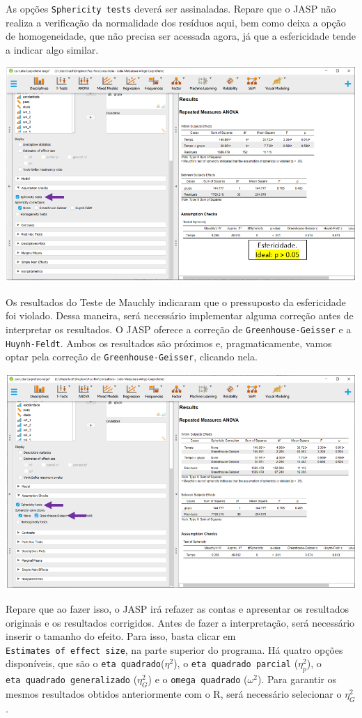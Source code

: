 \documentclass[
]{book}
\begin{document}
As opções \texttt{Sphericity\ tests} deverá ser assinaladas. Repare que
o JASP não realiza a verificação da normalidade dos resíduos aqui, bem
como deixa a opção de homogeneidade, que não precisa ser acessada agora,
já que a esfericidade tende a indicar algo similar.

\includegraphics{./img/cap_anovarm_esfericidade.png}

Os resultados do Teste de Mauchly indicaram que o pressuposto da
esfericidade foi violado. Dessa maneira, será necessário implementar
alguma correção antes de interpretar os resultados. O JASP oferece a
correção de \texttt{Greenhouse-Geisser} e a \texttt{Huynh-Feldt}. Ambos
os resultados são próximos e, pragmaticamente, vamos optar pela correção
de \texttt{Greenhouse-Geisser}, clicando nela.

\includegraphics{./img/cap_anovarm_esfericidade2.png}

Repare que ao fazer isso, o JASP irá refazer as contas e apresentar os
resultados originais e os resultados corrigidos. Antes de fazer a
interpretação, será necessário inserir o tamanho do efeito. Para isso,
basta clicar em \texttt{Estimates\ of\ effect\ size}, na parte superior
do programa. Há quatro opções disponíveis, que são o
\texttt{eta\ quadrado}(\(\eta^2\)), o \texttt{eta\ quadrado\ parcial}
(\(\eta^2_p\)), o \texttt{eta\ quadrado\ generalizado} (\(\eta^2_G\)) e
o \texttt{omega\ quadrado} (\(\omega^2\)). Para garantir os mesmos
resultados obtidos anteriormente com o R, será necessário selecionar o
\(\eta^2_G\).
\end{document}
